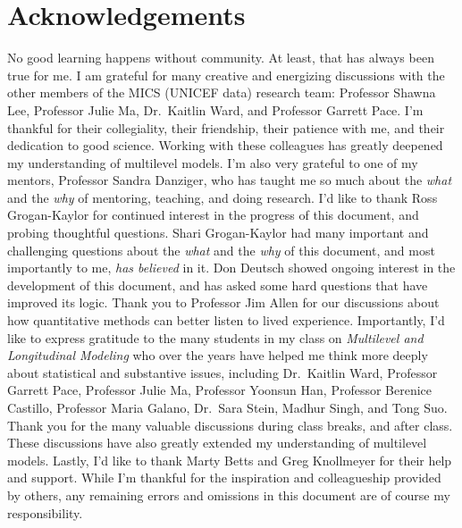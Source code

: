 \documentclass[
  letterpaper,
  DIV=11,
  numbers=noendperiod]{scrreprt}
\begin{document}

\hypertarget{acknowledgements}{%
\chapter*{Acknowledgements}\label{acknowledgements}}


No good learning happens without community. At least, that has always
been true for me. I am grateful for many creative and energizing
discussions with the other members of the MICS (UNICEF data) research
team: Professor Shawna Lee, Professor Julie Ma, Dr.~Kaitlin Ward, and
Professor Garrett Pace. I'm thankful for their collegiality, their
friendship, their patience with me, and their dedication to good
science. Working with these colleagues has greatly deepened my
understanding of multilevel models. I'm also very grateful to one of my
mentors, Professor Sandra Danziger, who has taught me so much about the
\emph{what} and the \emph{why} of mentoring, teaching, and doing
research. I'd like to thank Ross Grogan-Kaylor for continued interest in
the progress of this document, and probing thoughtful questions. Shari
Grogan-Kaylor had many important and challenging questions about the
\emph{what} and the \emph{why} of this document, and most importantly to
me, \emph{has believed} in it. Don Deutsch showed ongoing interest in
the development of this document, and has asked some hard questions that
have improved its logic. Thank you to Professor Jim Allen for our
discussions about how quantitative methods can better listen to lived
experience. Importantly, I'd like to express gratitude to the many
students in my class on \emph{Multilevel and Longitudinal Modeling} who
over the years have helped me think more deeply about statistical and
substantive issues, including Dr.~Kaitlin Ward, Professor Garrett Pace,
Professor Julie Ma, Professor Yoonsun Han, Professor Berenice Castillo,
Professor Maria Galano, Dr.~Sara Stein, Madhur Singh, and Tong Suo.
Thank you for the many valuable discussions during class breaks, and
after class. These discussions have also greatly extended my
understanding of multilevel models. Lastly, I'd like to thank Marty
Betts and Greg Knollmeyer for their help and support. While I'm thankful
for the inspiration and colleagueship provided by others, any remaining
errors and omissions in this document are of course my responsibility.
\end{document}

